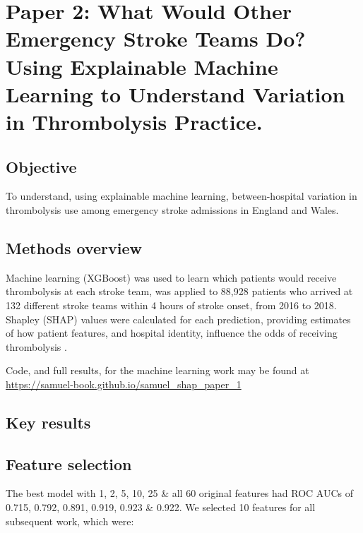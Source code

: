 \section{Paper 2: What Would Other Emergency Stroke Teams Do? Using Explainable Machine Learning to Understand Variation in Thrombolysis Practice.\cite{pearn_what_2023}}\label{sec:paper_2}

\subsection{Objective}

To understand, using explainable machine learning, between-hospital variation in thrombolysis use among emergency stroke admissions in England and Wales.

\subsection{Methods overview}

Machine learning (XGBoost\cite{chen_xgboost_2016}) was used to learn which patients would receive thrombolysis at each stroke team, was applied to 88,928 patients who arrived at 132 different stroke teams within 4 hours of stroke onset, from 2016 to 2018. Shapley (SHAP) values were calculated for each prediction, providing estimates of how patient features, and hospital identity, influence the odds of receiving thrombolysis \cite{lundberg_unified_2017}.

Code, and full results, for the machine learning work may be found at 
 \url{https://samuel-book.github.io/samuel_shap_paper_1}

\subsection{Key results}

\subsection{Feature selection}

The best model with 1, 2, 5, 10, 25 \& all 60 original features had ROC AUCs of 0.715, 0.792, 0.891, 0.919, 0.923 \& 0.922. We selected 10 features for all subsequent work, which were:

